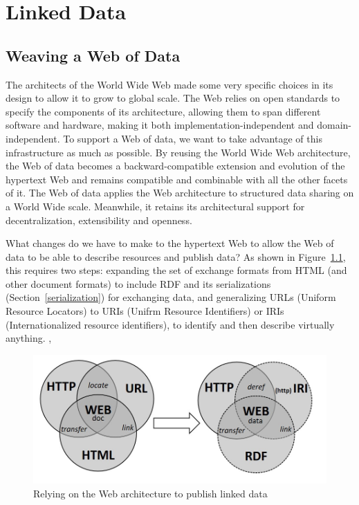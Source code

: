 \chapter{Linked Data}
\label{ch5}

\section{Weaving a Web of Data}



The architects  of the World Wide Web made some very specific choices in its design 
to allow it to grow to global scale.   The  Web relies on open standards to specify the components of its
architecture, allowing them to span different software and hardware, making it both implementation-independent and domain-independent. To
support a Web of data, we want to take advantage of this infrastructure as much as possible. 
By
reusing  the World Wide Web architecture, the Web of data
becomes a backward-compatible extension and evolution of the hypertext
Web and remains compatible and combinable with all the other facets of
it. The Web of data applies the Web architecture to structured data
sharing on a World Wide scale. Meanwhile, it retains its architectural
support for decentralization, extensibility and openness.


What changes do we have to make to the hypertext Web to allow the Web of data
to be able to describe  resources and publish data? As
shown in Figure~\ref{fig:ch5.1}, this requires two steps:  expanding the set of exchange formats from     HTML (and other document formats) to include  RDF and its serializations (Section~\ref{serialization}) for exchanging data, and generalizing 
URLs (Uniform Resource Locators) to URIs (Unifrm Resource Identifiers) 
or IRIs (Internationalized resource identifiers), to identify and then describe virtually anything. ,

\begin{figure}
    \centering
    \includegraphics[width=5.0in]{media/figure-05-01.jpg}
    \caption{Relying on the Web architecture to publish linked data}
    \label{fig:ch5.1}
\end{figure}


